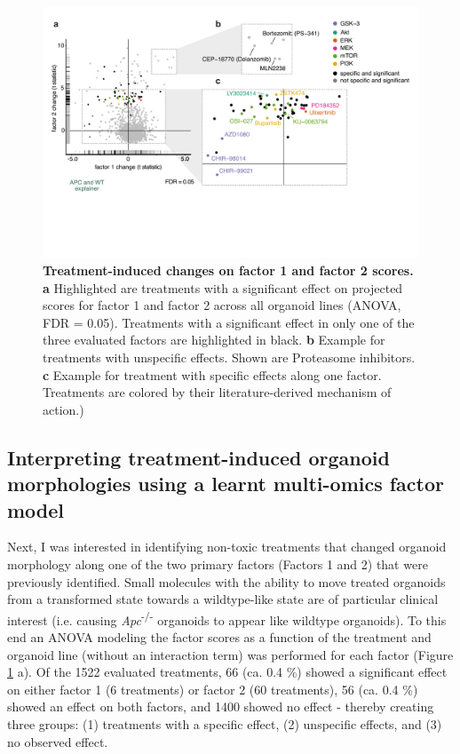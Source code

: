 \begin{flushleft}
\begin{figure}[h]
\centering
\includegraphics[scale=0.75,
                keepaspectratio]{figures/adenomaprofiling/pdf/fig_5_3_1.pdf}
\caption[Treatment-induced changes on factor 1 and factor 2 scores]{\textbf{Treatment-induced changes on factor 1 and factor 2 scores. a} Highlighted are treatments with a significant effect on projected scores for factor 1 and factor 2 across all organoid lines (ANOVA, FDR = 0.05). Treatments with a significant effect in only one of the three evaluated factors are highlighted in black. \textbf{b} Example for treatments with unspecific effects. Shown are Proteasome inhibitors. \textbf{c} Example for treatment with specific effects along one factor. Treatments are colored by their literature-derived mechanism of action.)}
\label{fig_181}
\end{figure}
\bigbreak

\clearpage
\subsection{Interpreting treatment-induced organoid morphologies using a learnt multi-omics factor model}

Next, I was interested in identifying non-toxic treatments that changed organoid morphology along one of the two primary factors (Factors 1 and 2) that were previously identified. Small molecules with the ability to move treated organoids from a transformed state towards a wildtype-like state are of particular clinical interest (i.e. causing \textit{Apc}\textsuperscript{-/-} organoids to appear like wildtype organoids). To this end an ANOVA modeling the factor scores as a function of the treatment and organoid line (without an interaction term) was performed for each factor (Figure \ref{fig_181} a). Of the 1522 evaluated treatments, 66 (ca. 0.4 \%) showed a significant effect on either factor 1 (6 treatments) or factor 2 (60 treatments), 56 (ca. 0.4 \%) showed an effect on both factors, and 1400 showed no effect - thereby creating three groups: (1) treatments with a specific effect, (2) unspecific effects, and (3) no observed effect. 
\par


\end{flushleft}
